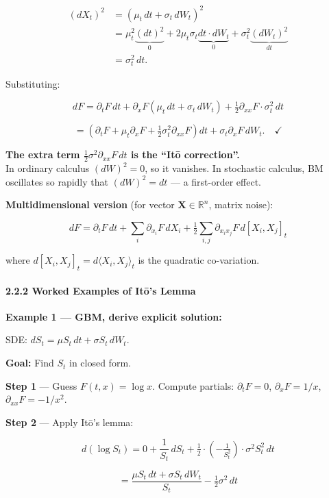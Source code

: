 \documentclass[11pt,a4paper]{article}
\begin{document}
\[\begin{aligned}
(dX_t)^2 &= (\mu_t\,dt + \sigma_t\,dW_t)^2 \\
          &= \mu_t^2\underbrace{(dt)^2}_{0} + 2\mu_t\sigma_t\underbrace{dt\cdot dW_t}_{0} + \sigma_t^2\underbrace{(dW_t)^2}_{dt}\\
          &= \sigma_t^2\,dt.
\end{aligned}\]

Substituting:

\[dF = \partial_t F\,dt + \partial_x F(\mu_t\,dt + \sigma_t\,dW_t) + \tfrac12\partial_{xx}F\cdot\sigma_t^2\,dt\]

\[= \left(\partial_t F + \mu_t\partial_x F + \tfrac12\sigma_t^2\partial_{xx}F\right)dt + \sigma_t\partial_x F\,dW_t. \quad \checkmark\]

\textbf{The extra term \(\tfrac12\sigma^2\partial_{xx}F\,dt\) is the ``Itō correction''.}\\
In ordinary calculus \((dW)^2=0\), so it vanishes. In stochastic calculus, BM oscillates so rapidly that \((dW)^2 = dt\) --- a first-order effect.

\textbf{Multidimensional version} (for vector \(\mathbf{X}\in\mathbb{R}^n\), matrix noise):

\[dF = \partial_t F\,dt + \sum_i \partial_{x_i}F\,dX_i + \tfrac12\sum_{i,j}\partial_{x_ix_j}F\,d[X_i,X_j]_t\]

where \(d[X_i, X_j]_t = d\langle X_i, X_j\rangle_t\) is the quadratic co-variation.

\paragraph{2.2.2 Worked Examples of Itō's Lemma}\label{worked-examples-of-itux14ds-lemma}

\textbf{Example 1 --- GBM, derive explicit solution:}

SDE: \(dS_t = \mu S_t\,dt + \sigma S_t\,dW_t\).

\textbf{Goal:} Find \(S_t\) in closed form.

\textbf{Step 1} --- Guess \(F(t,x) = \log x\). Compute partials: \(\partial_t F = 0\), \(\partial_x F = 1/x\), \(\partial_{xx}F = -1/x^2\).

\textbf{Step 2} --- Apply Itō's lemma:

\[d(\log S_t) = 0 + \frac{1}{S_t}\,dS_t + \tfrac12\cdot(-\tfrac{1}{S_t^2})\cdot\sigma^2 S_t^2\,dt\]

\[= \frac{\mu S_t\,dt + \sigma S_t\,dW_t}{S_t} - \tfrac12\sigma^2\,dt\]
\end{document}
